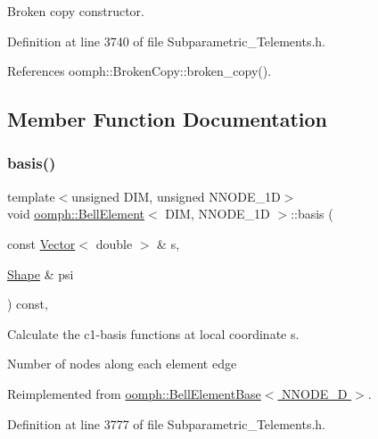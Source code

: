 Broken copy constructor. 



Definition at line 3740 of file Subparametric\+\_\+\+Telements.\+h.



References oomph\+::\+Broken\+Copy\+::broken\+\_\+copy().



\subsection{Member Function Documentation}
\mbox{\label{classoomph_1_1BellElement_a31a6dfd140d030104094a333d4331dbc}} 
\subsubsection{\texorpdfstring{basis()}{basis()}}
{\footnotesize\ttfamily template$<$unsigned D\+IM, unsigned N\+N\+O\+D\+E\+\_\+1D$>$ \\
void \hyperlink{classoomph_1_1BellElement}{oomph\+::\+Bell\+Element}$<$ D\+IM, N\+N\+O\+D\+E\+\_\+1D $>$\+::basis (\begin{DoxyParamCaption}\item[{const \hyperlink{classoomph_1_1Vector}{Vector}$<$ double $>$ \&}]{s,  }\item[{\hyperlink{classoomph_1_1Shape}{Shape} \&}]{psi }\end{DoxyParamCaption}) const\hspace{0.3cm}{\ttfamily [inline]}, {\ttfamily [virtual]}}



Calculate the c1-\/basis functions at local coordinate s. 

Number of nodes along each element edge 

Reimplemented from \hyperlink{classoomph_1_1BellElementBase_aee9266910010dcfca375fe0de13c17bb}{oomph\+::\+Bell\+Element\+Base$<$ N\+N\+O\+D\+E\+\_\+D $>$}.



Definition at line 3777 of file Subparametric\+\_\+\+Telements.\+h.

\mbox{\label{classoomph_1_1BellElement_ad99554f0767e1d82e371ebce2219521b}} 
